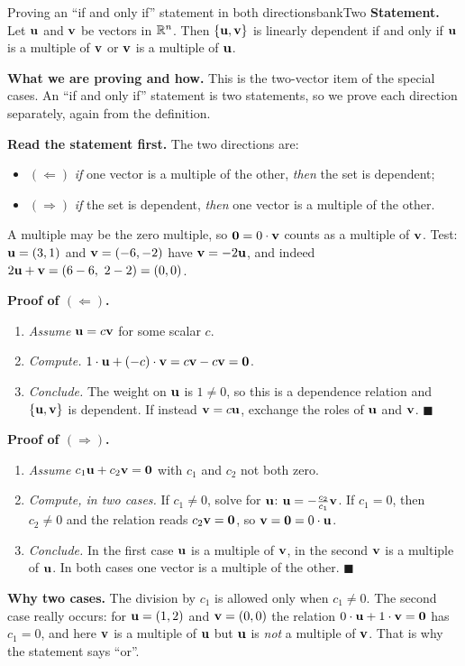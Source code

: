 \documentclass[11pt]{article}
\begin{document}
\begin{exmp}{Proving an ``if and only if'' statement in both directions}{bankTwo}
\textbf{Statement.} Let $\mathbf{u}$ and $\mathbf{v}$ be vectors in $\mathbb{R}^n$. Then $\{\mathbf{u},\mathbf{v}\}$ is linearly dependent if and only if $\mathbf{u}$ is a multiple of $\mathbf{v}$ or $\mathbf{v}$ is a multiple of $\mathbf{u}$.

\textbf{What we are proving and how.} This is the two-vector item of the special cases. An ``if and only if'' statement is two statements, so we prove each direction separately, again from the definition.

\textbf{Read the statement first.} The two directions are:
\begin{itemize}
  \item $(\Leftarrow)$ \emph{if} one vector is a multiple of the other, \emph{then} the set is dependent;
  \item $(\Rightarrow)$ \emph{if} the set is dependent, \emph{then} one vector is a multiple of the other.
\end{itemize}
A multiple may be the zero multiple, so $\mathbf{0}=0\cdot\mathbf{v}$ counts as a multiple of $\mathbf{v}$. Test: $\mathbf{u}=(3,1)$ and $\mathbf{v}=(-6,-2)$ have $\mathbf{v}=-2\mathbf{u}$, and indeed $2\mathbf{u}+\mathbf{v}=(6-6,\ 2-2)=(0,0)$.

\textbf{Proof of $(\Leftarrow)$.}
\begin{enumerate}[itemsep=2pt]
  \item \emph{Assume} $\mathbf{u}=c\mathbf{v}$ for some scalar $c$.
  \item \emph{Compute.} $1\cdot\mathbf{u}+(-c)\cdot\mathbf{v}=c\mathbf{v}-c\mathbf{v}=\mathbf{0}$.
  \item \emph{Conclude.} The weight on $\mathbf{u}$ is $1\neq0$, so this is a dependence relation and $\{\mathbf{u},\mathbf{v}\}$ is dependent. If instead $\mathbf{v}=c\mathbf{u}$, exchange the roles of $\mathbf{u}$ and $\mathbf{v}$. \qquad$\blacksquare$
\end{enumerate}

\textbf{Proof of $(\Rightarrow)$.}
\begin{enumerate}[itemsep=2pt]
  \item \emph{Assume} $c_1\mathbf{u}+c_2\mathbf{v}=\mathbf{0}$ with $c_1$ and $c_2$ not both zero.
  \item \emph{Compute, in two cases.} If $c_1\neq0$, solve for $\mathbf{u}$: $\mathbf{u}=-\tfrac{c_2}{c_1}\mathbf{v}$. If $c_1=0$, then $c_2\neq0$ and the relation reads $c_2\mathbf{v}=\mathbf{0}$, so $\mathbf{v}=\mathbf{0}=0\cdot\mathbf{u}$.
  \item \emph{Conclude.} In the first case $\mathbf{u}$ is a multiple of $\mathbf{v}$, in the second $\mathbf{v}$ is a multiple of $\mathbf{u}$. In both cases one vector is a multiple of the other. \qquad$\blacksquare$
\end{enumerate}

\textbf{Why two cases.} The division by $c_1$ is allowed only when $c_1\neq0$. The second case really occurs: for $\mathbf{u}=(1,2)$ and $\mathbf{v}=(0,0)$ the relation $0\cdot\mathbf{u}+1\cdot\mathbf{v}=\mathbf{0}$ has $c_1=0$, and here $\mathbf{v}$ is a multiple of $\mathbf{u}$ but $\mathbf{u}$ is \emph{not} a multiple of $\mathbf{v}$. That is why the statement says ``or''.
\end{exmp}
\end{document}
